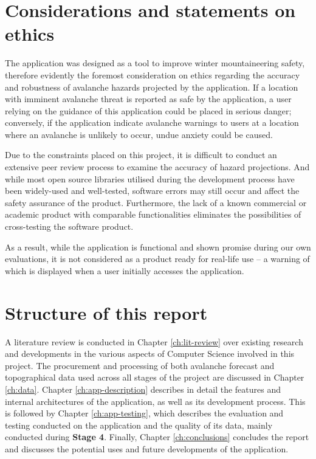 \documentclass[openany]{UoYCSproject}
\begin{document}
\section{Considerations and statements on ethics}

The application was designed as a tool to improve winter mountaineering safety, therefore evidently the foremost consideration on ethics regarding the accuracy and robustness of avalanche hazards projected by the application. If a location with imminent avalanche threat is reported as safe by the application, a user relying on the guidance of this application could be placed in serious danger; conversely, if the application indicate avalanche warnings to users at a location where an avalanche is unlikely to occur, undue anxiety could be caused.

Due to the constraints placed on this project, it is difficult to conduct an extensive peer review process to examine the accuracy of hazard projections. And while most open source libraries utilised during the development process have been widely-used and well-tested, software errors may still occur and affect the safety assurance of the product. Furthermore, the lack of a known commercial or academic product with comparable functionalities eliminates the possibilities of cross-testing the software product.

As a result, while the application is functional and shown promise during our own evaluations, it is not considered as a product ready for real-life use -- a warning of which is displayed when a user initially accesses the application.

\section{Structure of this report}

A literature review is conducted in Chapter \ref{ch:lit-review} over existing research and developments in the various aspects of Computer Science involved in this project. The procurement and processing of both avalanche forecast and topographical data used across all stages of the project are discussed in Chapter \ref{ch:data}. Chapter \ref{ch:app-description} describes in detail the features and internal architectures of the application, as well as its development process. This is followed by Chapter \ref{ch:app-testing}, which describes the evaluation and testing conducted on the application and the quality of its data, mainly conducted during \textbf{Stage 4}. Finally, Chapter \ref{ch:conclusions} concludes the report and discusses the potential uses and future developments of the application.
\end{document}
